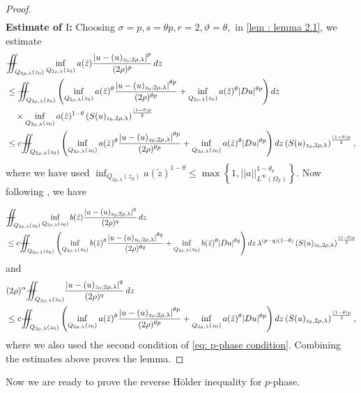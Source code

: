 \documentclass[11pt,oneside, english,reqno,twoside a4paper]{amsart}
\theoremstyle{definition}
\numberwithin{theorem}{section}
\numberwithin{equation}{section}
\newcommand{\iintss}{{\int\hspace{-0.28cm}\int}}
\newcommand{ \miints }{{\iintss\hspace{-0.56cm} -\hspace{-0.15cm}-}}
\newcommand{\miint}[1]{{\miints_{\hspace{-0.13cm}#1}}}
\begin{document}
\begin{proof}
\begin{align*}
\end{align*}
\textbf{Estimate of $\mathrm{I}$:} Choosing $\sigma=p, s=\theta p, r=2, \vartheta=\theta,$ in  \cref{lem : lemma 2.1}, we estimate
\begin{align*}
&\miint{Q_{2 \rho,\lambda}\left(z_0\right)} \inf_{Q_{2 \rho,\lambda}\left(z_0\right)} a(\tilde{z}) \frac{\left|u-(u)_{z_0 ; 2 \rho,\lambda}\right|^p}{(2 \rho)^p}\, dz \\
&\leq \miint{Q_{2 \rho,\lambda}\left(z_0\right)} \left(\inf_{Q_{2 \rho,\lambda}\left(z_0\right)} a(\tilde{z})^\theta \frac{\left|u-(u)_{z_0 ; 2 \rho,\lambda}\right|^{\theta p}}{(2 \rho)^{\theta p}}+ \inf_{Q_{2 \rho,\lambda}\left(z_0\right)} a(\tilde{z})^\theta |Du|^{\theta p} \right) dz \\
&\quad \times \inf_{Q_{2 \rho,\lambda}\left(z_0\right)} a(\tilde{z})^{1-\theta}\left(S(u)_{z_0, 2\rho, \lambda}\right)^{\frac{(1-\theta)p}{2}}\\
&\leq c \miint{Q_{2 \rho,\lambda}\left(z_0\right)} \left(\inf_{Q_{2 \rho,\lambda}\left(z_0\right)} a(\tilde{z})^\theta \frac{\left|u-(u)_{z_0 ; 2 \rho,\lambda}\right|^{\theta p}}{(2 \rho)^{\theta p}}+ \inf_{Q_{2 \rho,\lambda}\left(z_0\right)} a(\tilde{z})^\theta |Du|^{\theta p} \right) dz \left(S(u)_{z_0, 2\rho, \lambda}\right)^{\frac{(1-\theta)p}{2}},
\end{align*}
where we have used $\displaystyle{\inf_{Q_{2 \rho,\lambda}\left(z_0\right)}} a(\tilde{z})^{1-\theta} \leq \max\left\{1, ||a||^{1-\theta_0}_{L^{\infty}(\Omega_T)}\right\}.$ Now following \cite[Lemma 4.4]{2023_Gradient_Higher_Integrability_for_Degenerate_Parabolic_Double-Phase_Systems}, we have

\begin{align*}
&\miint{Q_{2 \rho,\lambda}\left(z_0\right)} \inf_{Q_{2 \rho,\lambda}\left(z_0\right)} b(\tilde{z})\frac{\left|u-(u)_{z_0 ; 2 \rho,\lambda}\right|^q}{(2 \rho)^q}\, dz\\
&\leq c\miint{Q_{2 \rho,\lambda}\left(z_0\right)} \left(\inf_{Q_{2 \rho,\lambda}\left(z_0\right)} b(\tilde{z})^\theta \frac{\left|u-(u)_{z_0 ; 2 \rho,\lambda}\right|^{\theta q}}{(2 \rho)^{\theta q}}+ \inf_{Q_{2 \rho,\lambda}\left(z_0\right)} b(\tilde{z})^\theta |Du|^{\theta q} \right) dz \, \lambda^{(p-q)(1-\theta)} \left(S(u)_{z_0, 2\rho, \lambda}\right)^{\frac{(1-\theta)p}{2}}
\end{align*}
and 
\begin{align*}
&(2\rho)^{\alpha}\miint{Q_{2 \rho,\lambda}\left(z_0\right)}\frac{\left|u-(u)_{z_0 ; 2 \rho,\lambda}\right|^q}{(2 \rho)^q}\, dz\\
&\leq c \miint{Q_{2 \rho,\lambda}\left(z_0\right)} \left(\inf_{Q_{2 \rho,\lambda}\left(z_0\right)} a(\tilde{z})^\theta \frac{\left|u-(u)_{z_0 ; 2 \rho,\lambda}\right|^{\theta p}}{(2 \rho)^{\theta p}}+ \inf_{Q_{2 \rho,\lambda}\left(z_0\right)} a(\tilde{z})^\theta |Du|^{\theta p} \right) dz \left(S(u)_{z_0, 2\rho, \lambda}\right)^{\frac{(1-\theta)p}{2}},
\end{align*}
where we also used the second condition of \eqref{eq: p-phase condition}. Combining the estimates above proves the lemma.
\end{proof}
Now we are ready to prove the reverse H\"{o}lder inequality for $p$-phase.
\end{document}
